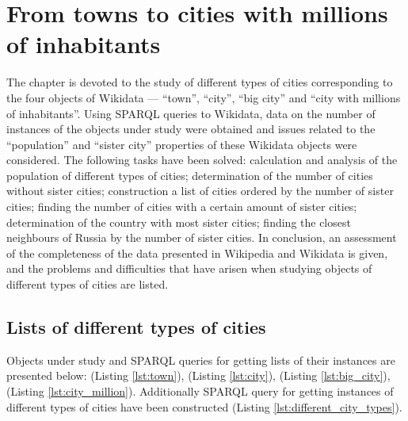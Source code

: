 \setchapterpreamble[u]{\margintoc}
\chapter[From towns to cities with millions of inhabitants]{From towns to cities with millions of inhabitants\protect\footnotemark}


The chapter is devoted to the study of different types of cities corresponding to the four objects of Wikidata — ``town'', ``city'', ``big city'' and ``city with millions of inhabitants''. Using SPARQL queries to Wikidata, data on the number of instances of the objects under study were obtained and issues related to the ``population'' and ``sister city'' properties of these Wikidata objects were considered. The following tasks have been solved: calculation and analysis of the population of different types of cities; determination of the number of cities without sister cities; construction a list of cities ordered by the number of sister cities; finding the number of cities with a certain amount of sister cities; determination of the country with most sister cities; finding the closest neighbours of Russia by the number of sister cities. In conclusion, an assessment of the completeness of the data presented in Wikipedia and Wikidata is given, and the problems and difficulties that have arisen when studying objects of different types of cities are listed.

\section{Lists of different types of cities}

Objects under study and SPARQL queries for getting lists of their instances are presented below:  (Listing \ref{lst:town}),  (Listing \ref{lst:city}),  (Listing \ref{lst:big_city}),  (Listing \ref{lst:city_million}). Additionally SPARQL query for getting instances of different types of cities have been constructed (Listing \ref{lst:different_city_types}).

